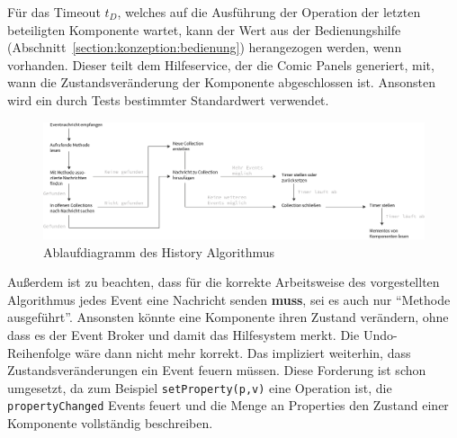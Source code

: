 \documentclass[
	headsepline,
	footsepline,
	fontsize=12pt,
	bibliography=totoc
]{scrbook}
\begin{document}
Für das Timeout $t_D$, welches auf die Ausführung der Operation der letzten beteiligten Komponente wartet, kann der Wert aus der Bedienungshilfe (Abschnitt~\ref{section:konzeption:bedienung}) herangezogen werden, wenn vorhanden. Dieser teilt dem Hilfeservice, der die Comic Panels generiert, mit, wann die Zustandsveränderung der Komponente abgeschlossen ist. Ansonsten wird ein durch Tests bestimmter Standardwert verwendet.

\begin{figure}[htbp]
   \centering
   \includegraphics[width=\textwidth]{images/konzeption-dependency-graph-diagram.png}
   \caption{Ablaufdiagramm des History Algorithmus}
   \label{figure:dependency-graph-diagram}
\end{figure}

Außerdem ist zu beachten, dass für die korrekte Arbeitsweise des vorgestellten Algorithmus jedes Event eine Nachricht senden \textbf{muss}, sei es auch nur \enquote{Methode ausgeführt}. Ansonsten könnte eine Komponente ihren Zustand verändern, ohne dass es der Event Broker und damit das Hilfesystem merkt. Die Undo-Reihenfolge wäre dann nicht mehr korrekt. Das impliziert weiterhin, dass Zustandsveränderungen ein Event feuern müssen. Diese Forderung ist schon umgesetzt, da zum Beispiel \texttt{setProperty(p,v)} eine Operation ist, die \texttt{propertyChanged} Events feuert und die Menge an Properties den Zustand einer Komponente vollständig beschreiben.

\end{document}
